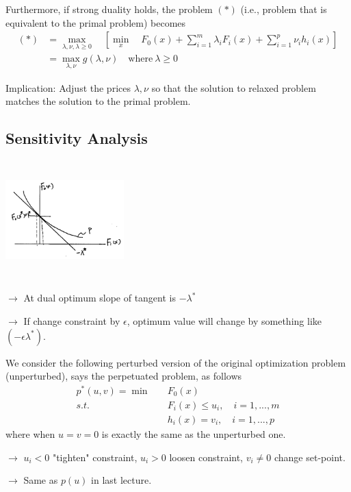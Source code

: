 Furthermore, if strong duality holds, the problem $(*)$ (i.e., problem that is equivalent to the primal problem) becomes
\begin{align*}
	(*) 
	&= \max_{\lambda, \nu, \lambda \geq 0}\quad [\min_x\quad F_0(x) + \sum^m_{i=1}\lambda_iF_i(x) + \sum^p_{i=1}\nu_ih_i(x)]\\
	&= \max_{\lambda, \nu} g(\lambda, \nu) \quad \text{where}\ \lambda \geq 0
\end{align*}

Implication: Adjust the prices $\lambda, \nu$ so that the solution to relaxed problem matches the solution to the primal problem.
\subsection{Sensitivity Analysis}
\begin{marginfigure}
	\centering
	\includegraphics[width=1.8in,height=1.8in]{figures/ch10/figure1127_4.png}
\end{marginfigure}

\quad $\rightarrow$ At dual optimum slope of tangent is $-\lambda^*$

$\rightarrow$
If change constraint by $\epsilon$, optimum value will change by something like $(-\epsilon \lambda^*)$.


We consider the following perturbed version of the original optimization problem (unperturbed), says the perpetuated problem, as follows
\begin{align*}
	p^*(u,v) = \min \quad &F_0(x) \\
	s.t.\quad & F_i(x) \leq u_i ,\quad i = 1,...,m\\
	& h_i(x) = v_i,\quad i = 1,..., p
\end{align*}
where when $u=v=0$ is exactly the same as the unperturbed one.

$\rightarrow$ $u_i<0$ "tighten" constraint, $u_i>0$ loosen constraint, $v_i\neq 0$ change set-point.

$\rightarrow$ Same as $p(u)$ in last lecture.

